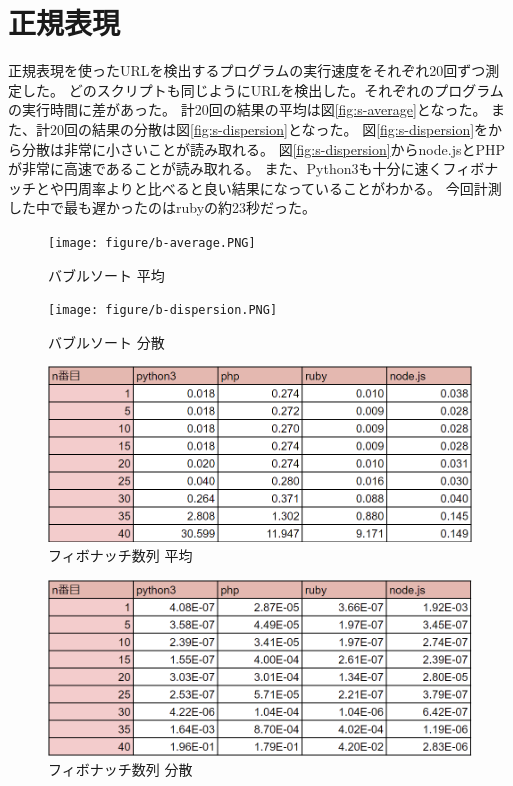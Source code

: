 \section{正規表現}
正規表現を使ったURLを検出するプログラムの実行速度をそれぞれ20回ずつ測定した。
どのスクリプトも同じようにURLを検出した。それぞれのプログラムの実行時間に差があった。
計20回の結果の平均は図\ref{fig:s-average}となった。
また、計20回の結果の分散は図\ref{fig:s-dispersion}となった。
図\ref{fig:s-dispersion}をから分散は非常に小さいことが読み取れる。
図\ref{fig:s-dispersion}からnode.jsとPHPが非常に高速であることが読み取れる。
また、Python3も十分に速くフィボナッチとや円周率よりと比べると良い結果になっていることがわかる。
今回計測した中で最も遅かったのはrubyの約23秒だった。

\clearpage
\begin{figure}[tb]
    \centering
    \texttt{[image: figure/b-average.PNG]}
    \caption{バブルソート 平均}
    \label{fig:b-average}
\end{figure}

\begin{figure}[tb]
    \centering
    \texttt{[image: figure/b-dispersion.PNG]}
    \caption{バブルソート 分散}
    \label{fig:b-dispersion}
\end{figure}

\clearpage
\begin{figure}[tb]
    \centering
    \includegraphics[width=14.5cm,keepaspectratio]{figure/f-average.PNG}
    \caption{フィボナッチ数列 平均}
    \label{fig:f-average}
\end{figure}

\begin{figure}[tb]
    \centering
    \includegraphics[width=14.5cm,keepaspectratio]{figure/f-dispersion.PNG}
    \caption{フィボナッチ数列 分散}
    \label{fig:f-dispersion}
\end{figure}


